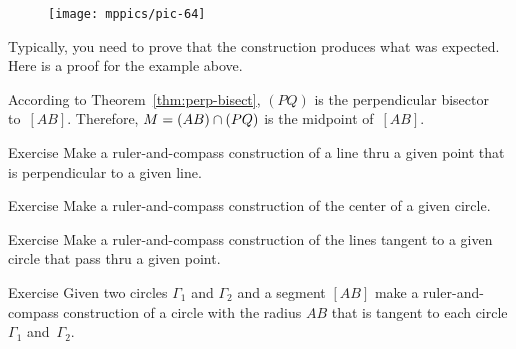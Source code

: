 \begin{figure}[!ht]
\centering
\texttt{[image: mppics/pic-64]}
\end{figure}

Typically, you need to prove that the construction produces what was expected. Here is a proof for the example above.

According to Theorem~\ref{thm:perp-bisect}, $(PQ)$ is the perpendicular bisector to~$[AB]$.
Therefore, $M\z=(AB)\cap(PQ)$ is the midpoint of~$[AB]$. 
\qeds



\begin{thm}{Exercise}\label{ex:construction-perpendicular}
Make a ruler-and-compass construction of a line thru a given point that is perpendicular to a given line.
\end{thm}

\begin{thm}{Exercise}\label{ex:center}
Make a ruler-and-compass construction of the center 
of a given circle.
\end{thm}

\begin{thm}{Exercise}\label{ex:tangent}
Make a ruler-and-compass construction of the lines tangent to a given circle that pass thru a given point.
\end{thm}

\begin{thm}{Exercise}\label{ex:tangent-circle}
Given two circles $\Gamma_1$ and $\Gamma_2$ and a segment $[AB]$
make a ruler-and-compass construction of a circle with the radius $AB$ 
that is tangent to each circle $\Gamma_1$ and~$\Gamma_2$.
\end{thm}


